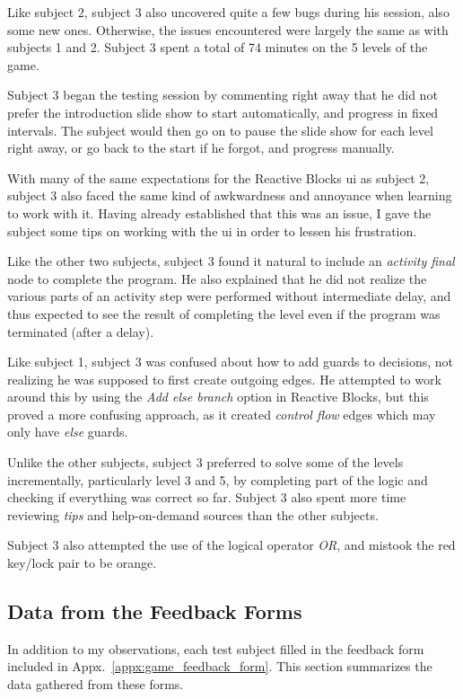 \noindent
Like subject 2, subject 3 also uncovered quite a few bugs during his session, also some new ones. Otherwise, the issues encountered were largely the same as with subjects 1 and 2. Subject 3 spent a total of 74 minutes on the 5 levels of the game.

\noindent
Subject 3 began the testing session by commenting right away that he did not prefer the introduction slide show to start automatically, and progress in fixed intervals. The subject would then go on to pause the slide show for each level right away, or go back to the start if he forgot, and progress manually.

\noindent
With many of the same expectations for the Reactive Blocks \gls{ui} as subject 2, subject 3 also faced the same kind of awkwardness and annoyance when learning to work with it. Having already established that this was an issue, I gave the subject some tips on working with the \gls{ui} in order to lessen his frustration.

\noindent
Like the other two subjects, subject 3 found it natural to include an \emph{activity final} node to complete the program. He also explained that he did not realize the various parts of an activity step were performed without intermediate delay, and thus expected to see the result of completing the level even if the program was terminated (after a delay).

\noindent
Like subject 1, subject 3 was confused about how to add guards to decisions, not realizing he was supposed to first create outgoing edges. He attempted to work around this by using the \emph{Add else branch} option in Reactive Blocks, but this proved a more confusing approach, as it created \emph{control flow} edges which may only have \emph{else} guards.

\noindent
Unlike the other subjects, subject 3 preferred to solve some of the levels incrementally, particularly level 3 and 5, by completing part of the logic and checking if everything was correct so far. Subject 3 also spent more time reviewing \emph{tips} and help-on-demand sources than the other subjects. 

\noindent
Subject 3 also attempted the use of the logical operator \emph{OR}, and mistook the red key/lock pair to be orange.

\subsection{Data from the Feedback Forms}
\label{sec:game_feedback_data}
In addition to my observations, each test subject filled in the feedback form included in Appx.~\ref{appx:game_feedback_form}. This section summarizes the data gathered from these forms.

